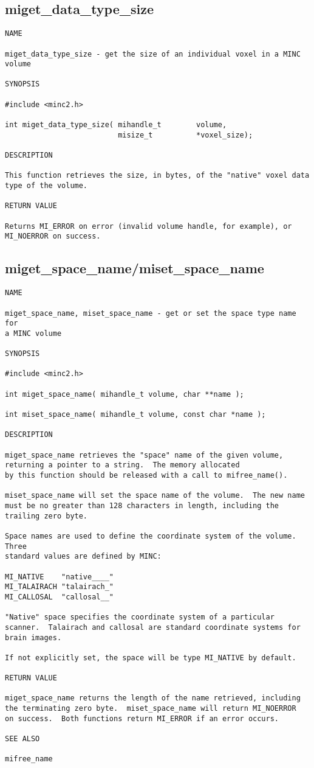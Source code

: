 \documentclass{article}
\begin{document}
\subsection{miget\_data\_type\_size}
\begin{verbatim}
NAME

miget_data_type_size - get the size of an individual voxel in a MINC volume

SYNOPSIS

#include <minc2.h>

int miget_data_type_size( mihandle_t        volume, 
                          misize_t          *voxel_size);

DESCRIPTION

This function retrieves the size, in bytes, of the "native" voxel data
type of the volume.

RETURN VALUE

Returns MI_ERROR on error (invalid volume handle, for example), or
MI_NOERROR on success.
\end{verbatim}

\subsection{miget\_space\_name/miset\_space\_name}
\begin{verbatim}
NAME 

miget_space_name, miset_space_name - get or set the space type name for
a MINC volume

SYNOPSIS

#include <minc2.h>

int miget_space_name( mihandle_t volume, char **name );

int miset_space_name( mihandle_t volume, const char *name );

DESCRIPTION

miget_space_name retrieves the "space" name of the given volume,
returning a pointer to a string.  The memory allocated
by this function should be released with a call to mifree_name().

miset_space_name will set the space name of the volume.  The new name
must be no greater than 128 characters in length, including the
trailing zero byte.

Space names are used to define the coordinate system of the volume.  Three
standard values are defined by MINC:

MI_NATIVE    "native____"
MI_TALAIRACH "talairach_"
MI_CALLOSAL  "callosal__"

"Native" space specifies the coordinate system of a particular
scanner.  Talairach and callosal are standard coordinate systems for
brain images.

If not explicitly set, the space will be type MI_NATIVE by default.

RETURN VALUE

miget_space_name returns the length of the name retrieved, including
the terminating zero byte.  miset_space_name will return MI_NOERROR
on success.  Both functions return MI_ERROR if an error occurs.

SEE ALSO

mifree_name
\end{verbatim}
\end{document}
